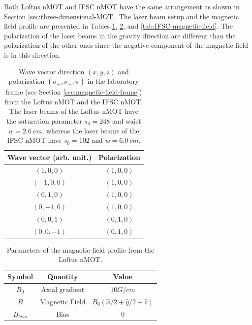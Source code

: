 
Both Loftus nMOT and IFSC nMOT have the same arrangement as shown in Section \ref{sec:three-dimensional-MOT}. The laser beam setup and the magnetic field profile are presented in Tables \ref{tab:loftus-laser-beams}, \ref{tab:Loftus-magnetic-field}, and \ref{tab:IFSC-magnetic-field}. The polarization of the laser beams in the gravity direction are different than the polarization of the other ones since the negative component of the magnetic field is in this direction.

\begin{table}[ht!]
    \centering
    \caption{Wave vector direction $ (x, y, z) $ and polarization $ (\sigma_+, \sigma_-, \pi) $ in the laboratory frame (see Section \ref{sec:magnetic-field-frame}) from the Loftus nMOT and the IFSC nMOT. The laser beams of the Loftus nMOT have the saturation parameter $ s_0 = 248 $ and waist $ w = 2.6\ cm $, whereas the laser beams of the IFSC nMOT have $ s_0 = 102 $ and $ w = 6.0\ cm$.}
    \begin{tabular}{|c|c|}
        \hline
        \textbf{Wave vector (arb. unit.)} & \textbf{Polarization} \\ \hline
        $ (1, 0, 0) $ & $ (1, 0, 0) $ \\
        $ (-1, 0, 0) $ & $ (1, 0, 0) $ \\
        $ (0, 1, 0) $ & $ (1, 0, 0) $ \\
        $ (0, -1, 0) $ & $ (1, 0, 0) $ \\
        $ (0, 0, 1) $ & $ (0, 1, 0) $ \\
        $ (0, 0, -1) $ & $ (0, 1, 0) $ \\
        \hline
    \end{tabular}
    \vspace{10px}
    \label{tab:loftus-laser-beams}
\end{table}

\begin{table}[ht!]
    \centering
    \caption{Parameters of the magnetic field profile from the Loftus nMOT.}
    \begin{tabular}{|c|c|c|}
        \hline
        \textbf{Symbol} & \textbf{Quantity} & \textbf{Value} \\ \hline
        $ B_0 $ & Axial gradient & $ 10 G / cm $ \\
        $ B $ & Magnetic Field & $ B_0(\hat{x}/2 + \hat{y}/2 - \hat{z}) $ \\
        $ B_{bias} $ & Bias & $ 0 $ \\
        \hline
    \end{tabular}
    \vspace{10px}
    \label{tab:Loftus-magnetic-field}
\end{table}

